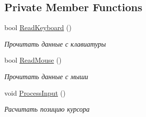 \subsection*{Private Member Functions}
\begin{DoxyCompactItemize}
\item 
bool \hyperlink{class_input_class_ae7280f9f29e4638b3a031548913f05ea}{Read\+Keyboard} ()
\begin{DoxyCompactList}\small\item\em Прочитать данные с клавиатуры \end{DoxyCompactList}\item 
bool \hyperlink{class_input_class_ab15b53b43aef926cb37dbbefee25dc5e}{Read\+Mouse} ()
\begin{DoxyCompactList}\small\item\em Прочитать данные с мыши \end{DoxyCompactList}\item 
void \hyperlink{class_input_class_a60e882f90d3028cde15caa0ee39df7e7}{Process\+Input} ()
\begin{DoxyCompactList}\small\item\em Расчитать позицию курсора \end{DoxyCompactList}\end{DoxyCompactItemize}
